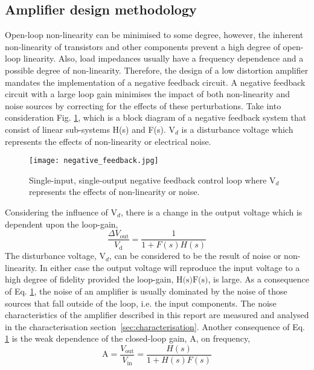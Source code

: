 \documentclass[a4paper,10pt, oneside]{article}
\begin{document}
\subsection*{Amplifier design methodology}
Open-loop non-linearity can be minimised to some degree, however, the inherent non-linearity of transistors and other components prevent a high degree of open-loop linearity. Also, load impedances usually have a frequency dependence and a possible degree of non-linearity. Therefore, the design of a low distortion amplifier mandates the implementation of a negative feedback circuit. A negative feedback circuit with a large loop gain minimises the impact of both non-linearity and noise sources by correcting for the effects of these perturbations. Take into consideration Fig. \ref{feedback}, which is a block diagram of a negative feedback system that consist of linear sub-systems H(s) and F(s). $\textrm{V}_{d}$ is a disturbance voltage which represents the effects of non-linearity or electrical noise.
\begin{figure}
\vspace{-2cm}
\begin{centering}
  \texttt{[image: negative\_feedback.jpg]}
  \caption{Single-input, single-output negative feedback control loop
  	where $\textrm{V}_{d}$ represents the effects of non-linearity or noise.}\label{feedback}
\end{centering}  	
\end{figure}
Considering the influence of $\textrm{V}_{d}$, there is a change in the output voltage which is dependent upon the loop-gain,
\begin{equation}
\frac{\Delta V_{\textrm{out}}}{V_{\textrm{d}}}=\frac{1}{1+F(s)H(s)}
\end{equation}
The disturbance voltage, $\textrm{V}_{d}$, can be considered to be the result of noise or
non-linearity. In either case the output voltage will reproduce the input voltage to a high degree of fidelity provided the loop-gain, $\textrm{H(s)F(s)}$, is large. As a consequence of Eq. \ref{feedback}, the noise of an amplifier is usually dominated by the noise of those sources that fall outside of the loop, i.e. the input components. The noise characteristics of the amplifier described in this report are measured and analysed in the characterisation section~\ref{sec:characterisation}. Another consequence of Eq. \ref{feedback} is the weak dependence of the closed-loop gain, A, on frequency,
\begin{equation}
\textrm{A} = \frac{V_{\textrm{out}}}{V_{\textrm{in}}}=\frac{H(s)}{1+H(s)F(s)}
\end{equation}
\end{document}
